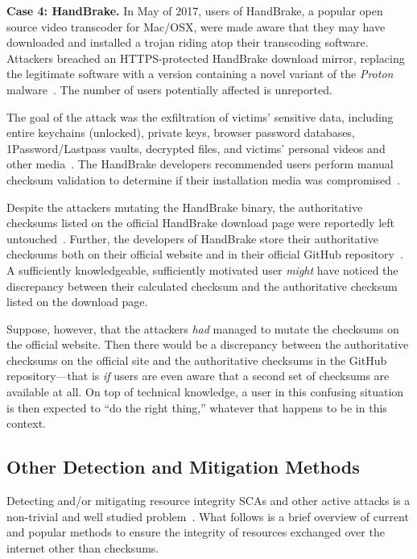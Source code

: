 \noindent\textbf{Case 4: HandBrake.} In May of 2017, users of HandBrake, a
popular open source video transcoder for Mac/OSX, were made aware that they may
have downloaded and installed a trojan riding atop their transcoding software.
Attackers breached an HTTPS-protected HandBrake download mirror, replacing the
legitimate software with a version containing a novel variant of the
\emph{Proton} malware~\cite{SCA-HB1}. The number of users potentially affected
is unreported.

The goal of the attack was the exfiltration of victims' sensitive data,
including entire keychains (unlocked), private keys, browser password databases,
1Password/Lastpass vaults, decrypted files, and victims' personal videos and
other media~\cite{SCA-HB1}. The HandBrake developers recommended users perform
manual checksum validation to determine if their installation media was
compromised~\cite{SCA-HB2}.

Despite the attackers mutating the HandBrake binary, the authoritative checksums
listed on the official HandBrake download page were reportedly left
untouched~\cite{SCA-HB2}. Further, the developers of HandBrake store their
authoritative checksums both on their official website and in their official
GitHub repository~\cite{SCA-HB2}. A sufficiently knowledgeable, sufficiently
motivated user \emph{might} have noticed the discrepancy between their
calculated checksum and the authoritative checksum listed on the download page.

Suppose, however, that the attackers \textit{had} managed to mutate the
checksums on the official website. Then there would be a discrepancy between the
authoritative checksums on the official site and the authoritative checksums in
the GitHub repository---that is \emph{if} users are even aware that a second set
of checksums are available at all. On top of technical knowledge, a user in this
confusing situation is then expected to ``do the right thing,'' whatever that
happens to be in this context.

\subsection{Other Detection and Mitigation Methods}

Detecting and/or mitigating resource integrity SCAs and other active attacks is
a non-trivial and well studied problem~\cite{MD5Header, HTTP1.1, HTTPS, SRI, LF,
OpenPGP1, DNSSEC, PKI}. What follows is a brief overview of current and popular
methods to ensure the integrity of resources exchanged over the internet other
than checksums.


